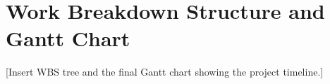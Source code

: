 \section{Work Breakdown Structure and Gantt Chart}
[Insert WBS tree and the final Gantt chart showing the project timeline.]
